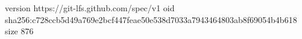 version https://git-lfs.github.com/spec/v1
oid sha256:c728ccb5d49a769e2bcf447feae50e538d7033a7943464803ab8f69054b4b618
size 876
